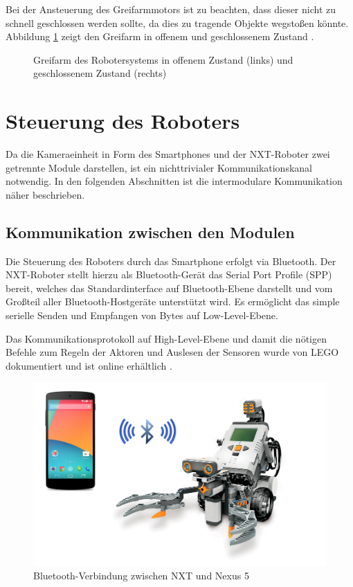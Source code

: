 Bei der Ansteuerung des Greifarmmotors ist zu beachten, dass dieser nicht zu schnell geschlossen werden sollte, da dies zu tragende Objekte wegstoßen könnte. Abbildung \ref{fig:Greifarm} zeigt den Greifarm in offenem und geschlossenem Zustand .

\begin{figure}[h]
\centering
{}
\caption[Greifarm des Robotersystems]{Greifarm des Robotersystems in offenem Zustand (links) und geschlossenem Zustand (rechts)}
\label{fig:Greifarm}
\end{figure}

\section{Steuerung des Roboters}
\label{sec:RoboterSteuerung}

Da die Kameraeinheit in Form des Smartphones und der NXT-Roboter zwei getrennte Module darstellen, ist ein nichttrivialer Kommunikationskanal notwendig. In den folgenden Abschnitten ist die intermodulare Kommunikation näher beschrieben.

\subsection{Kommunikation zwischen den Modulen}

Die Steuerung des Roboters durch das Smartphone erfolgt via Bluetooth. Der NXT-Roboter stellt hierzu als Bluetooth-Gerät das Serial Port Profile (SPP) bereit, welches das Standardinterface auf Bluetooth-Ebene darstellt und vom Großteil aller Bluetooth-Hostgeräte unterstützt wird. Es ermöglicht das simple serielle Senden und Empfangen von Bytes auf Low-Level-Ebene.

Das Kommunikationsprotokoll auf High-Level-Ebene und damit die nötigen Befehle zum Regeln der Aktoren und Auslesen der Sensoren wurde von LEGO dokumentiert und ist online erhältlich \cite{nxt_comm_protocol}.

\begin{figure}[h]
\centering
\includegraphics[width=\textwidth/2]{Bilder/Robot/bluetooth}
\caption{Bluetooth-Verbindung zwischen NXT und Nexus 5}
\label{fig:bluetooth}
\end{figure}

